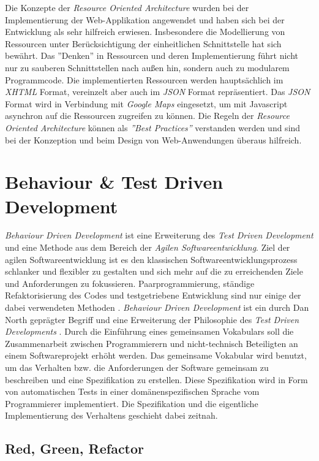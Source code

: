 Die Konzepte der \textit{Resource Oriented Architecture} wurden bei
der Implementierung der Web-Applikation angewendet und haben sich bei
der Entwicklung als sehr hilfreich erwiesen. Insbesondere die
Modellierung von Ressourcen unter Berücksichtigung der einheitlichen
Schnittstelle hat sich bewährt. Das ''Denken'' in Ressourcen und deren
Implementierung führt nicht nur zu sauberen Schnittstellen nach außen
hin, sondern auch zu modularem Programmcode. Die implementierten
Ressourcen werden hauptsächlich im \textit{XHTML} Format, vereinzelt
aber auch im \textit{JSON} Format repräsentiert. Das \textit{JSON}
Format wird in Verbindung mit \textit{Google Maps} eingesetzt, um mit
Javascript asynchron auf die Ressourcen zugreifen zu können. Die
Regeln der \textit{Resource Oriented Architecture} können als
\textit{''Best Practices''} verstanden werden und sind bei der
Konzeption und beim Design von Web-Anwendungen überaus hilfreich.

\section{Behaviour \& Test Driven Development}

\textit{Behaviour Driven Development} ist eine Erweiterung des
\textit{Test Driven Development} und eine Methode aus dem Bereich der
\textit{Agilen Softwareentwicklung}. Ziel der agilen
Softwareentwicklung ist es den klassischen Softwareentwicklungsprozess
schlanker und flexibler zu gestalten und sich mehr auf die zu
erreichenden Ziele und Anforderungen zu
fokussieren. Paarprogrammierung, ständige Refaktorisierung des Codes
und testgetriebene Entwicklung sind nur einige der dabei verwendeten
Methoden \cite{wiki:agile}. \textit{Behaviour Driven Development} ist
ein durch Dan North geprägter Begriff und eine Erweiterung der
Philosophie des \textit{Test Driven Developments}
\cite{wiki:bdd}. Durch die Einführung eines gemeinsamen Vokabulars
soll die Zusammenarbeit zwischen Programmierern und nicht-technisch
Beteiligten an einem Softwareprojekt erhöht werden. Das gemeinsame
Vokabular wird benutzt, um das Verhalten bzw. die Anforderungen der
Software gemeinsam zu beschreiben und eine Spezifikation zu erstellen.
Diese Spezifikation wird in Form von automatischen Tests in einer
domänen\-spezifischen Sprache vom Programmierer implementiert. Die
Spezifikation und die eigentliche Implementierung des Verhaltens
geschieht dabei zeitnah.

\subsection{Red, Green, Refactor}

